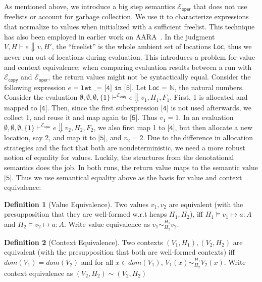 \documentclass{easychair}
\newcommand{\ms}[1]{\ensuremath{\mathsf{#1}}}
\newcommand{\veq}[4]{#3 \sim^{#1}_{#2} #4}
\newcommand{\ctxeq}[2]{(#1) \sim (#2)}
\newcommand{\copySem}{\ensuremath{\mathcal{E}_{\ms{copy}}}}
\theoremstyle{definition}
\newtheorem{definition}{Definition}
\begin{document}
As mentioned above, we introduce a big step semantics $\mathcal{E}_{\ms{oper}}$
that does not use freelists or account for garbage collection. We use
it to characterize expressions that normalize to values when initialized with a sufficient 
freelist.  This technique has also been employed in earlier work on AARA~\cite{Hofmann:2003:SPH:604131.604148}.
In the judgment $V,H \vdash e \Downarrow v,H'$, the ``freelist'' is the whole ambient set of
locations $\ms{Loc}$, thus we never run out of locations during evaluation. This introduces a
problem for value and context equivalence: when comparing evaluation results between a run
with \copySem{} and $\mathcal{E}_{\ms{oper}}$, the return values 
might not be syntactically equal. Consider the following expression
$e = \texttt{let \_ = [4] in [5]}$.
%
Let \ms{Loc} = $\mathbb{N}$, the natural numbers. Consider the evaluation
$\emptyset,\emptyset,\emptyset,\{1\} \vdash^{\copySem{}} e \Downarrow v_1,H_1,F_1$. 
First, 1 is allocated and mapped to $\texttt{[4]}$. 
Then, since the first subexpression $\texttt{[4]}$ is not used afterwards, we collect 1, and reuse it
and map again to $\texttt{[5]}$. Thus $v_1 = 1$.  In an evaluation
$\emptyset,\emptyset,\emptyset,\{1\} \vdash^{\mathcal{E}_{\ms{oper}}} e \Downarrow v_2,H_2,F_2$, 
we also first map 1 to $\texttt{[4]}$, but then 
allocate a new location, say 2, and map it to $\texttt{[5]}$, and $v_2 =  2$. Due to the 
difference in allocation strategies and the fact that both are nondeterministic, we need a more 
robust notion of equality for values. Luckily, the structures from the denotational semantics 
does the job. In both runs, the return value maps to the semantic value $\texttt{[5]}$.
Thus we use semantical equality above as the basis for value and context equivalence:

\begin{definition}[Value Equivalence]
Two values $v_1,v_2$ are equivalent (with the presupposition that they are well-formed w.r.t heaps $H_1,H_2$),
iff $H_1 \vDash v_1 \mapsto a : A$ and $H_2 \vDash v_2 \mapsto a : A$. 
Write value equivalence as $\veq{H_1}{H_2}{v_1}{v_2}$.
\end{definition}

\begin{definition}[Context Equivalence]
Two contexts $(V_1,H_1), (V_2,H_2)$ are equivalent
(with the presupposition that both are well-formed contexts) iff $dom(V_1) = dom(V_2)$ and 
for all $x \in dom(V_1)$, $\veq{H_1}{H_2}{V_1(x)}{V_2(x)}$. Write context equivalence as 
$\ctxeq{V_2,H_2}{V_2,H_2}$
\end{definition}
\end{document}
